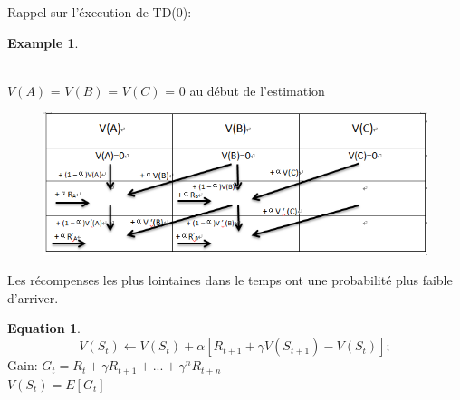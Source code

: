 \documentclass{beamer}	%
\theoremstyle{plain}
\theoremstyle{definition}
\newtheorem{eq}{Equation}[section]
\newtheorem{ex}{Example}[section]
\theoremstyle{remark}
\numberwithin{equation}{section}
\begin{document}
\begin{frame}

Rappel sur l'éxecution de TD(0):
\begin{ex}
\begin{center}
\\
$V(A)$ = $V(B)$ = $V(C)$ = 0 au début de l'estimation
\end{center}

\begin{figure}
\begin{minipage}[t]{1\linewidth}
\centering
\includegraphics[width=0.90 \textwidth,height=0.5\textheight]{photo/ex.png}
\label{fig:side:a}
\end{minipage}%

\end{figure}
\end{ex}
\end{frame}


\begin{frame}
Les récompenses les plus lointaines dans le temps ont une probabilité plus faible d'arriver.
\begin{eq}

\begin{equation}
    V(S_{t}) \leftarrow V(S_{t}) + \alpha \left [ R_{t+1} + \gamma V(S_{t+1}) - V(S_{t}) \right ] ;
\end{equation}
    Gain: $G_{t} = R_{t} + \gamma R_{t+1} + ... + \gamma^n R_{t+n}$
    \\
    $ V(S_{t}) = E[G_{t}]$
\end{eq}
\end{frame}
\end{document}
